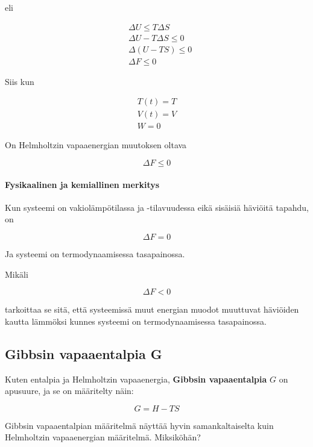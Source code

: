 \documentclass[12pt,a4paper,finnish]{book}
\begin{document}
eli 

\begin{align}
 & \Delta U \leq T\Delta S\\
 & \Delta U - T\Delta S \leq 0\\
 & \Delta(U - TS) \leq 0\\
 & \Delta F \leq 0
\end{align}

Siis kun

\begin{align}
 T(t) = T\\
 V(t) = V\\
 W = 0
\end{align}

On Helmholtzin vapaaenergian muutoksen oltava

\begin{equation}
 \Delta F \leq 0
\end{equation}

\paragraph{Fysikaalinen ja kemiallinen merkitys}

Kun systeemi on vakiolämpötilassa ja -tilavuudessa eikä sisäisiä häviöitä tapahdu, on 

\begin{equation}
 \Delta F = 0
\end{equation}

Ja systeemi on termodynaamisessa tasapainossa.

Mikäli

\begin{equation}
 \Delta F < 0
\end{equation}

tarkoittaa se sitä, että systeemissä muut energian muodot muuttuvat häviöiden kautta lämmöksi 
kunnes systeemi on termodynaamisessa tasapainossa.

\subsection{Gibbsin vapaaentalpia G}

Kuten entalpia ja Helmholtzin vapaaenergia, \textbf{Gibbsin vapaaentalpia} $G$ on apusuure, 
ja se on määritelty näin:

\begin{equation}
 G = H - TS
\end{equation}

Gibbsin vapaaentalpian määritelmä näyttää hyvin samankaltaiselta kuin Helmholtzin vapaaenergian määritelmä. 
Miksiköhän?
\end{document}
